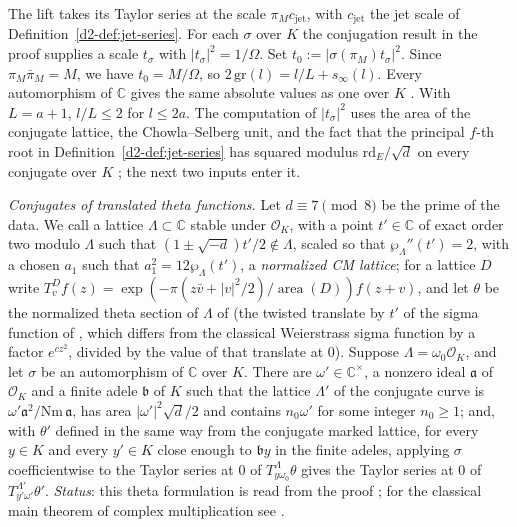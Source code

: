 \documentclass[reqno]{amsart}
\theoremstyle{definition}
\theoremstyle{plain}
\theoremstyle{remark}
\newcommand{\C}{\mathbb{C}}
\newcommand{\sinf}{s_\infty}
\newcommand{\rd}{\mathrm{rd}_E}
\newcommand{\Oc}{\mathcal{O}}
\begin{document}
The lift takes its Taylor series at the scale \(\pi_M c_{\mathrm{jet}}\), with \(c_{\mathrm{jet}}\) the jet scale of Definition~\ref{d2-def:jet-series}.  For each \(\sigma\) over \(K\) the conjugation result in the proof supplies a scale \(t_\sigma\) with \(\lvert t_\sigma\rvert^2 = 1/\Omega\).  Set \(t_0 := \lvert\sigma(\pi_M)t_\sigma\rvert^2\).  Since \(\pi_M\bar\pi_M = M\), we have \(t_0 = M/\Omega\), so \(2\,\mathrm{gr}(l) = l/L + \sinf(l)\).  Every automorphism of \(\C\) gives the same absolute values as one over \(K\) \cite{GL}.  With \(L = a + 1\), \(l/L \le 2\) for \(l \le 2a\).  The computation of \(\lvert t_\sigma\rvert^2\) uses the area of the conjugate lattice, the Chowla--Selberg unit, and the fact that the principal \(f\)-th root in Definition~\ref{d2-def:jet-series} has squared modulus \(\rd/\sqrt d\) on every conjugate over \(K\) \cite{GL}; the next two inputs enter it.

\emph{Conjugates of translated theta functions.}  Let \(d \equiv 7 \pmod 8\) be the prime of the data.  We call a lattice \(\Lambda \subset \C\) stable under \(\Oc_K\), with a point \(t' \in \C\) of exact order two modulo \(\Lambda\) such that \((1 \pm \sqrt{-d})t'/2 \notin \Lambda\), scaled so that \(\wp_\Lambda''(t') = 2\), with a chosen \(a_1\) such that \(a_1^2 = 12\wp_\Lambda(t')\), a \emph{normalized CM lattice}; for a lattice \(D\) write \(T^D_v f(z) = \exp(-\pi(z\bar v + \lvert v\rvert^2/2)/\operatorname{area}(D))f(z + v)\), and let \(\theta\) be the normalized theta section of \(\Lambda\) of \cite{GL} (the twisted translate by \(t'\) of the sigma function of \cite{GL}, which differs from the classical Weierstrass sigma function by a factor \(e^{cz^2}\), divided by the value of that translate at \(0\)).  Suppose \(\Lambda = \omega_0\Oc_K\), and let \(\sigma\) be an automorphism of \(\C\) over \(K\).  There are \(\omega' \in \C^\times\), a nonzero ideal \(\mathfrak a\) of \(\Oc_K\) and a finite adele \(\mathfrak b\) of \(K\) such that the lattice \(\Lambda'\) of the conjugate curve is \(\omega'\mathfrak a^2/\mathrm{Nm}\,\mathfrak a\), has area \(\lvert\omega'\rvert^2\sqrt d/2\) and contains \(n_0\omega'\) for some integer \(n_0 \ge 1\); and, with \(\theta'\) defined in the same way from the conjugate marked lattice, for every \(y \in K\) and every \(y' \in K\) close enough to \(\mathfrak b y\) in the finite adeles, applying \(\sigma\) coefficientwise to the Taylor series at \(0\) of \(T^\Lambda_{y\omega_0}\theta\) gives the Taylor series at \(0\) of \(T^{\Lambda'}_{y'\omega'}\theta'\).  \emph{Status}: this theta formulation is read from the proof \cite{GL}; for the classical main theorem of complex multiplication see \cite[Thm.~5.4]{Sh}.
\end{document}
